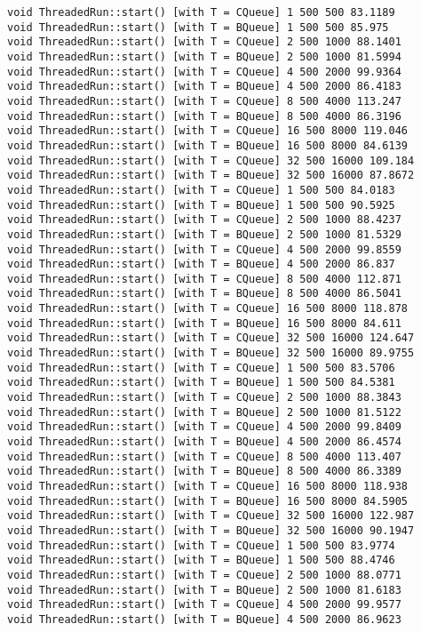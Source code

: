 \begin{verbatim}
void ThreadedRun::start() [with T = CQueue] 1 500 500 83.1189
void ThreadedRun::start() [with T = BQueue] 1 500 500 85.975
void ThreadedRun::start() [with T = CQueue] 2 500 1000 88.1401
void ThreadedRun::start() [with T = BQueue] 2 500 1000 81.5994
void ThreadedRun::start() [with T = CQueue] 4 500 2000 99.9364
void ThreadedRun::start() [with T = BQueue] 4 500 2000 86.4183
void ThreadedRun::start() [with T = CQueue] 8 500 4000 113.247
void ThreadedRun::start() [with T = BQueue] 8 500 4000 86.3196
void ThreadedRun::start() [with T = CQueue] 16 500 8000 119.046
void ThreadedRun::start() [with T = BQueue] 16 500 8000 84.6139
void ThreadedRun::start() [with T = CQueue] 32 500 16000 109.184
void ThreadedRun::start() [with T = BQueue] 32 500 16000 87.8672
void ThreadedRun::start() [with T = CQueue] 1 500 500 84.0183
void ThreadedRun::start() [with T = BQueue] 1 500 500 90.5925
void ThreadedRun::start() [with T = CQueue] 2 500 1000 88.4237
void ThreadedRun::start() [with T = BQueue] 2 500 1000 81.5329
void ThreadedRun::start() [with T = CQueue] 4 500 2000 99.8559
void ThreadedRun::start() [with T = BQueue] 4 500 2000 86.837
void ThreadedRun::start() [with T = CQueue] 8 500 4000 112.871
void ThreadedRun::start() [with T = BQueue] 8 500 4000 86.5041
void ThreadedRun::start() [with T = CQueue] 16 500 8000 118.878
void ThreadedRun::start() [with T = BQueue] 16 500 8000 84.611
void ThreadedRun::start() [with T = CQueue] 32 500 16000 124.647
void ThreadedRun::start() [with T = BQueue] 32 500 16000 89.9755
void ThreadedRun::start() [with T = CQueue] 1 500 500 83.5706
void ThreadedRun::start() [with T = BQueue] 1 500 500 84.5381
void ThreadedRun::start() [with T = CQueue] 2 500 1000 88.3843
void ThreadedRun::start() [with T = BQueue] 2 500 1000 81.5122
void ThreadedRun::start() [with T = CQueue] 4 500 2000 99.8409
void ThreadedRun::start() [with T = BQueue] 4 500 2000 86.4574
void ThreadedRun::start() [with T = CQueue] 8 500 4000 113.407
void ThreadedRun::start() [with T = BQueue] 8 500 4000 86.3389
void ThreadedRun::start() [with T = CQueue] 16 500 8000 118.938
void ThreadedRun::start() [with T = BQueue] 16 500 8000 84.5905
void ThreadedRun::start() [with T = CQueue] 32 500 16000 122.987
void ThreadedRun::start() [with T = BQueue] 32 500 16000 90.1947
void ThreadedRun::start() [with T = CQueue] 1 500 500 83.9774
void ThreadedRun::start() [with T = BQueue] 1 500 500 88.4746
void ThreadedRun::start() [with T = CQueue] 2 500 1000 88.0771
void ThreadedRun::start() [with T = BQueue] 2 500 1000 81.6183
void ThreadedRun::start() [with T = CQueue] 4 500 2000 99.9577
void ThreadedRun::start() [with T = BQueue] 4 500 2000 86.9623

\end{verbatim}
